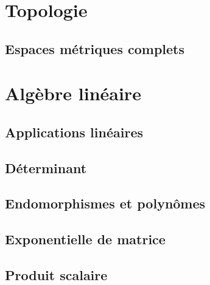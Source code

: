 \documentclass[a4paper,11pt]{book}
\begin{document}
\part{Topologie}

\chapter{Espaces métriques complets}


\clearpage

\part{Algèbre linéaire}

\chapter{Applications linéaires}


\clearpage

\chapter{Déterminant}


\clearpage

\chapter{Endomorphismes et polynômes}


\clearpage


\clearpage

\chapter{Exponentielle de matrice}


\clearpage


\clearpage


\clearpage


\clearpage

\chapter{Produit scalaire}
\end{document}
